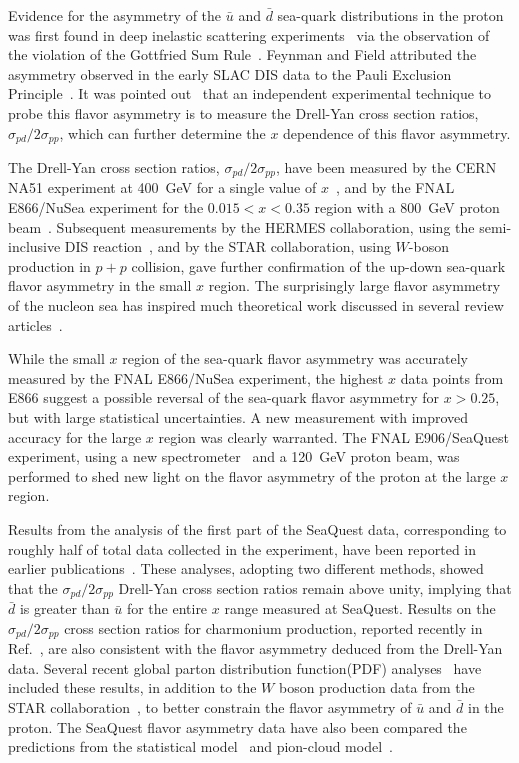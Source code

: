 \documentclass[reprint,aps,unsortedaddress,superscriptaddress,prl,floatfix,showpacs,linenumbers]{revtex4-2}
\begin{document}
Evidence for the asymmetry of the $\bar{u}$ and $\bar{d}$ sea-quark
distributions in the proton was first found in
deep inelastic scattering experiments~\cite{stein1975,amaudruz1991} via
the observation of the violation
of the Gottfried Sum Rule~\cite{gottfried1967}. Feynman and Field
attributed the asymmetry observed in the early SLAC DIS data to the Pauli
Exclusion Principle~\cite{field1977}. It was pointed out~\cite{ellis1991}
that an independent experimental technique to probe this flavor asymmetry is
to measure the Drell-Yan cross section ratios,
$\sigma_{pd}/2\sigma_{pp}$, which can further determine the $x$ dependence
of this flavor asymmetry.

The Drell-Yan cross section ratios,
$\sigma_{pd}/2\sigma_{pp}$, have been measured by the CERN NA51 experiment at
\SI{400}{\GeV} for a single value of $x$~\cite{NA51:1994xrz}, and by the FNAL
E866/NuSea experiment for the $0.015 < x < 0.35$ region with a \SI{800}{\GeV}
proton beam~\cite{hawker1998,peng1998,towell2001}. Subsequent measurements by the
HERMES collaboration, using the semi-inclusive DIS reaction~\cite{ackerstaff1998},
and by the STAR collaboration, using $W$-boson production in $p+p$ collision,
gave further confirmation of the up-down sea-quark flavor asymmetry in
the small $x$ region. The surprisingly large flavor asymmetry of the nucleon
sea has inspired much theoretical work discussed in several review
articles~\cite{kumano1998,vogt2000a,garvey2001,chang2014,geesaman2019}.

While the small $x$ region of the sea-quark flavor asymmetry was accurately
measured by the FNAL E866/NuSea experiment, the highest $x$ data points from
E866 suggest a possible reversal of the sea-quark flavor asymmetry for $x > 0.25$,
but with large statistical uncertainties. A new measurement with improved
accuracy for the large $x$ region was clearly warranted. The FNAL
E906/SeaQuest experiment, using a new spectrometer~\cite{aidala2019} and
a \SI{120}{\GeV} proton beam, was performed to shed new light on the flavor asymmetry
of the proton at the large $x$ region.

Results from the analysis of the first part of the SeaQuest data, corresponding
to roughly half of total data collected in the experiment, have been reported
in earlier publications~\cite{dove2021,dove2023}.
These analyses, adopting two different methods, showed that the
$\sigma_{pd}/2\sigma_{pp}$ Drell-Yan cross section ratios remain
above unity, implying that
$\bar{d}$ is greater than $\bar{u}$ for the entire $x$ range measured
at SeaQuest. Results on the $\sigma_{pd}/2\sigma_{pp}$  cross section ratios
for charmonium production, reported recently in
Ref.~\cite{leung2024a}, are also consistent with the flavor asymmetry
deduced from the Drell-Yan data.
Several recent global parton distribution function(PDF)
analyses~\cite{cocuzza2021,ball2022a,accardi2023,alekhin2023}
have included these results, in addition to the $W$ boson production data
from the STAR collaboration~\cite{adam2021}, to better constrain the
flavor asymmetry of $\bar u$ and $\bar d$ in the proton. The SeaQuest
flavor asymmetry data have also been compared the predictions from the
statistical model~\cite{soffer2019} and pion-cloud model~\cite{alberg2022}.
\end{document}
